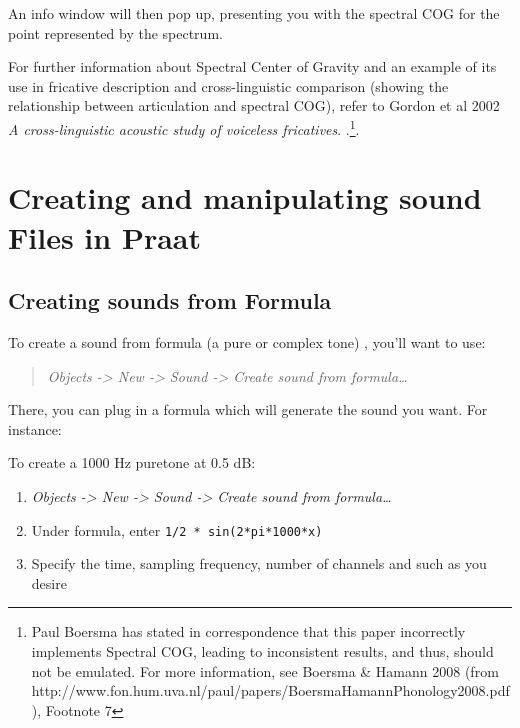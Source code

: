 An info window will then pop up, presenting you with the spectral COG
for the point represented by the spectrum.

For further information about Spectral Center of Gravity and an example
of its use in fricative description and cross-linguistic comparison
(showing the relationship between articulation and spectral COG), refer
to Gordon et al 2002 \emph{A cross-linguistic acoustic study of
voiceless fricatives}.
\cite{Gordon:2002vv}.\footnote{Paul Boersma has stated in correspondence that this paper incorrectly implements Spectral COG, leading to inconsistent results, and thus, should not be emulated.  For more information, see Boersma \& Hamann 2008 (from http://www.fon.hum.uva.nl/paul/papers/BoersmaHamannPhonology2008.pdf), Footnote 7}.

\hypertarget{creating-and-manipulating-sound-files-in-praat}{%
\section{Creating and manipulating sound Files in
Praat}\label{creating-and-manipulating-sound-files-in-praat}}

\hypertarget{creating-sounds-from-formula}{%
\subsection{Creating sounds from
Formula}\label{creating-sounds-from-formula}}

\label{creatingsounds}

To create a sound from formula (a pure or complex tone) , you'll want to
use:

\begin{quote}
\emph{Objects -\textgreater{} New -\textgreater{} Sound -\textgreater{}
Create sound from formula\ldots{}}
\end{quote}

There, you can plug in a formula which will generate the sound you want.
For instance:

To create a 1000 Hz puretone at 0.5 dB:

\begin{enumerate}
\def\labelenumi{\arabic{enumi}.}
\tightlist
\item
  \emph{Objects -\textgreater{} New -\textgreater{} Sound
  -\textgreater{} Create sound from formula\ldots{}}
\item
  Under formula, enter \texttt{1/2 * sin(2*pi*1000*x)}
\item
  Specify the time, sampling frequency, number of channels and such as
  you desire
\end{enumerate}

